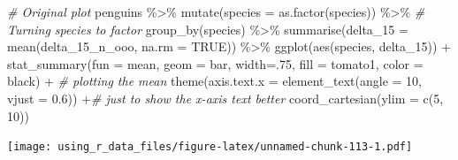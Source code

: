 \documentclass[
]{book}
\newenvironment{Shaded}{\begin{snugshade}}{\end{snugshade}}
\newcommand{\AttributeTok}[1]{\textcolor[rgb]{0.77,0.63,0.00}{#1}}
\newcommand{\CommentTok}[1]{\textcolor[rgb]{0.56,0.35,0.01}{\textit{#1}}}
\newcommand{\ConstantTok}[1]{\textcolor[rgb]{0.00,0.00,0.00}{#1}}
\newcommand{\DecValTok}[1]{\textcolor[rgb]{0.00,0.00,0.81}{#1}}
\newcommand{\FloatTok}[1]{\textcolor[rgb]{0.00,0.00,0.81}{#1}}
\newcommand{\FunctionTok}[1]{\textcolor[rgb]{0.00,0.00,0.00}{#1}}
\newcommand{\NormalTok}[1]{#1}
\newcommand{\SpecialCharTok}[1]{\textcolor[rgb]{0.00,0.00,0.00}{#1}}
\newcommand{\StringTok}[1]{\textcolor[rgb]{0.31,0.60,0.02}{#1}}
\begin{document}
\begin{Shaded}
\begin{Highlighting}[]
\CommentTok{\# Original plot}
\NormalTok{penguins }\SpecialCharTok{\%\textgreater{}\%} 
  \FunctionTok{mutate}\NormalTok{(}\AttributeTok{species =} \FunctionTok{as.factor}\NormalTok{(species)) }\SpecialCharTok{\%\textgreater{}\%}  \CommentTok{\# Turning species to factor}
  \FunctionTok{group\_by}\NormalTok{(species) }\SpecialCharTok{\%\textgreater{}\%} 
  \FunctionTok{summarise}\NormalTok{(}\AttributeTok{delta\_15 =} \FunctionTok{mean}\NormalTok{(delta\_15\_n\_ooo, }\AttributeTok{na.rm =} \ConstantTok{TRUE}\NormalTok{)) }\SpecialCharTok{\%\textgreater{}\%} 
  \FunctionTok{ggplot}\NormalTok{(}\FunctionTok{aes}\NormalTok{(species, delta\_15)) }\SpecialCharTok{+}
  \FunctionTok{stat\_summary}\NormalTok{(}\AttributeTok{fun =}\NormalTok{ mean, }\AttributeTok{geom =} \StringTok{\textquotesingle{}bar\textquotesingle{}}\NormalTok{, }\AttributeTok{width=}\NormalTok{.}\DecValTok{75}\NormalTok{, }\AttributeTok{fill =} \StringTok{\textquotesingle{}tomato1\textquotesingle{}}\NormalTok{, }\AttributeTok{color =} \StringTok{\textquotesingle{}black\textquotesingle{}}\NormalTok{) }\SpecialCharTok{+}  \CommentTok{\# plotting the mean}
  \FunctionTok{theme}\NormalTok{(}\AttributeTok{axis.text.x =} \FunctionTok{element\_text}\NormalTok{(}\AttributeTok{angle =} \DecValTok{10}\NormalTok{, }\AttributeTok{vjust =} \FloatTok{0.6}\NormalTok{)) }\SpecialCharTok{+}\CommentTok{\# just to show the x{-}axis text better}
  \FunctionTok{coord\_cartesian}\NormalTok{(}\AttributeTok{ylim =} \FunctionTok{c}\NormalTok{(}\DecValTok{5}\NormalTok{, }\DecValTok{10}\NormalTok{))}
\end{Highlighting}
\end{Shaded}

\texttt{[image: using\_r\_data\_files/figure-latex/unnamed-chunk-113-1.pdf]}
\end{document}
